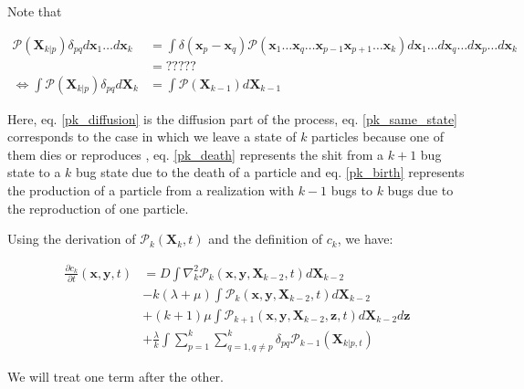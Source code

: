 Note that

\begin{align}
\mathcal{P}(\boldsymbol{X}_{k|p})\delta_{pq}d\boldsymbol{x}_{1}\ldots d\boldsymbol{x}_{k} & =\int\delta(\boldsymbol{x}_{p}-\boldsymbol{x}_{q})\mathcal{P}(\boldsymbol{x}_{1}\ldots\boldsymbol{x}_{q}\ldots\boldsymbol{x}_{p-1}\boldsymbol{x}_{p+1}\ldots\boldsymbol{x}_{k})d\boldsymbol{x}_{1}\ldots d\boldsymbol{x}_{q}\ldots d\boldsymbol{x}_{p}\ldots d\boldsymbol{x}_{k}\\
 & =?????\label{eq:missing_step}\\
\Leftrightarrow\int\mathcal{P}(\boldsymbol{X}_{k|p})\delta_{pq}d\boldsymbol{X}_{k} & =\int\mathcal{P}(\boldsymbol{X}_{k-1})d\boldsymbol{X}_{k-1}\label{delta_simplify}
\end{align}

Here, eq. \ref{pk_diffusion} is the diffusion part of the process,
eq. \ref{pk_same_state} corresponds to the case in which we leave
a state of $k$ particles because one of them dies or reproduces ,
eq. \ref{pk_death} represents the shit from a $k+1$ bug state to
a $k$ bug state due to the death of a particle and eq. \ref{pk_birth}
represents the production of a particle from a realization with $k-1$
bugs to $k$ bugs due to the reproduction of one particle.

Using the derivation of $\mathcal{P}_{k}(\boldsymbol{X}_{k},t)$ and
the definition of $c_{k}$, we have:

\begin{subequations} 
\begin{align}
\frac{\partial c_{k}}{\partial t}(\boldsymbol{x},\boldsymbol{y},t) & =D\int\nabla_{k}^{2}\mathcal{P}_{k}(\boldsymbol{x},\boldsymbol{y},\boldsymbol{X}_{k-2},t)d\boldsymbol{X}_{k-2}\label{ck_diffusion}\\
 & -k(\lambda+\mu)\int\mathcal{P}_{k}(\boldsymbol{x},\boldsymbol{y},\boldsymbol{X}_{k-2},t)d\boldsymbol{X}_{k-2}\label{ck_same_state}\\
 & +(k+1)\mu\int\mathcal{P}_{k+1}(\boldsymbol{x},\boldsymbol{y},\boldsymbol{X}_{k-2},\boldsymbol{z},t)d\boldsymbol{X}_{k-2}d\boldsymbol{z}\label{ck_death}\\
 & +\frac{\lambda}{k}\int\sum_{p=1}^{k}\sum_{q=1,q\neq p}^{k}\delta_{pq}\mathcal{P}_{k-1}(\boldsymbol{X}_{k|p,t})\label{ck_birth}
\end{align}
\end{subequations}

We will treat one term after the other. \\


